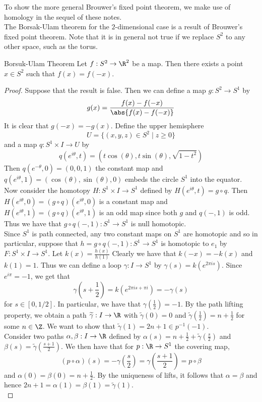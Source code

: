 \documentclass[a4paper]{article}
\begin{document}
To show the more general Brouwer's fixed point theorem, we make use of homology in the sequel of these notes. \\

The Borsak-Ulam theorem for the $2$-dimensional case is a result of Brouwer's fixed point theorem. Note that it is in general not true if we replace $S^2$ to any other space, such as the torus. 

\begin{prp}{Borsuk-Ulam Theorem}{} Let $f:S^2\to\R^2$ be a map. Then there exists a point $x\in S^2$ such that $f(x)=f(-x)$. 
\begin{proof}
Suppose that the result is false. Then we can define a map $g:S^2\to S^1$ by $$g(x)=\frac{f(x)-f(-x)}{\abs{f(x)-f(-x)}}$$ It is clear that $g(-x)=-g(x)$. Define the upper hemisphere $$U=\{(x,y,z)\in S^2\;|\;z\geq 0\}$$ and a map $q:S^1\times I\to U$ by $$q(e^{i\theta},t)=\left(t\cos(\theta),t\sin(\theta),\sqrt{1-t^2}\right)$$ Then $q(e^{-\theta},0)=(0,0,1)$ the constant map and $q(e^{i\theta},1)=(\cos(\theta),\sin(\theta),0)$ embeds the circle $S^1$ into the equator. Now consider the homotopy $H:S^1\times I\to S^1$ defined by $H(e^{i\theta},t)=g\circ q$. Then $H(e^{i\theta},0)=(g\circ q)(e^{i\theta},0)$ is a constant map and $H(e^{i\theta},1)=(g\circ q)(e^{i\theta},1)$ is an odd map since both $g$ and $q(-,1)$ is odd. Thus we have that $g\circ q(-,1):S^1\to S^1$ is null homotopic. \\

Since $S^1$ is path connected, any two constant maps on $S^1$ are homotopic and so in particular, suppose that $h=g\circ q(-,1):S^1\to S^1$ is homotopic to $e_1$ by $F:S^1\times I\to S^1$. Let $k(x)=\frac{h(x)}{h(1)}$ Clearly we have that $k(-x)=-k(x)$ and $k(1)=1$. Thus we can define a loop $\gamma:I\to S^1$ by $\gamma(s)=k(e^{2\pi is})$. Since $e^{i\pi}=-1$, we get that $$\gamma\left(s+\frac{1}{2}\right)=k(e^{2\pi is+\pi i})=-\gamma(s)$$ for $s\in[0,1/2]$. In particular, we have that $\gamma\left(\frac{1}{2}\right)=-1$. By the path lifting property, we obtain a path $\widetilde{\gamma}:I\to\R$ with $\widetilde{\gamma}(0)=0$ and $\widetilde{\gamma}\left(\frac{1}{2}\right)=n+\frac{1}{2}$ for some $n\in\Z$. We want to show that $\widetilde{\gamma}(1)=2n+1\in p^{-1}(-1)$. \\

Consider two paths $\alpha,\beta:I\to\R$ defined by $\alpha(s)=n+\frac{1}{2}+\widetilde{\gamma}\left(\frac{s}{2}\right)$ and $\beta(s)=\widetilde{\gamma}\left(\frac{s+1}{2}\right)$. We then have that for $p:\R\to S^1$ the covering map, $$(p\circ\alpha)(s)=-\gamma\left(\frac{s}{2}\right)=\gamma\left(\frac{s+1}{2}\right)=p\circ\beta$$ and $\alpha(0)=\beta(0)=n+\frac{1}{2}$. By the uniqueness of lifts, it follows that $\alpha=\beta$ and hence $2n+1=\alpha(1)=\beta(1)=\widetilde{\gamma}(1)$. \\


\end{proof}
\end{prp}
\end{document}
